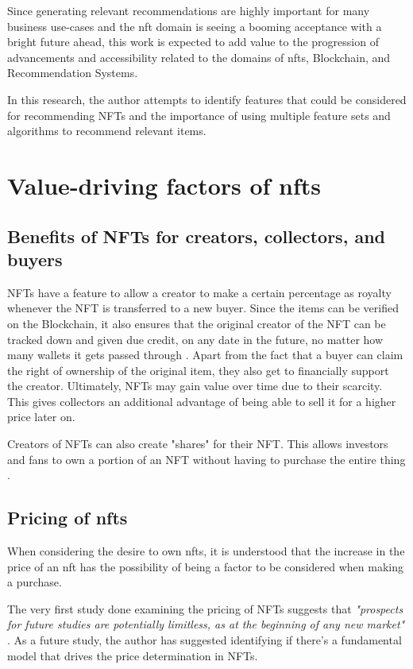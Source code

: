 \documentclass[conference]{IEEEtran}
\begin{document}
\bigbreak
Since generating relevant recommendations are highly important for many business use-cases and the \gls{nft} domain is seeing a booming acceptance with a bright future ahead, this work is expected to add value to the progression of advancements and accessibility related to the domains of \gls{nft}s, Blockchain, and Recommendation Systems.

 In this research, the author attempts to identify features that could be considered for recommending NFTs and the importance of using multiple feature sets and algorithms to recommend relevant items.


\section{Value-driving factors of \gls{nft}s}

\subsection{Benefits of NFTs for creators, collectors, and buyers}
NFTs have a feature to allow a creator to make a certain percentage as royalty whenever the NFT is transferred to a new buyer. Since the items can be verified on the Blockchain, it also ensures that the original creator of the NFT can be tracked down and given due credit, on any date in the future, no matter how many wallets it gets passed through \autocite{chevet_blockchain_2018}. Apart from the fact that a buyer can claim the right of ownership of the original item, they also get to financially support the creator. Ultimately, NFTs may gain value over time due to their scarcity. This gives collectors an additional advantage of being able to sell it for a higher price later on.

Creators of NFTs can also create "shares" for their NFT. This allows investors and fans to own a portion of an NFT without having to purchase the entire thing \autocite{noauthor_erc-721_nodate}.

\subsection{Pricing of \gls{nft}s}

When considering the desire to own \gls{nft}s, it is understood that the increase in the price of an \gls{nft} has the possibility of being a factor to be considered when making a purchase.

The very first study done examining the pricing of NFTs suggests that \emph{"prospects for future studies are potentially limitless, as at the beginning of any new market"} \autocite{dowling_fertile_2021}. As a future study, the author has suggested identifying if there's a fundamental model that drives the price determination in NFTs.
\end{document}
